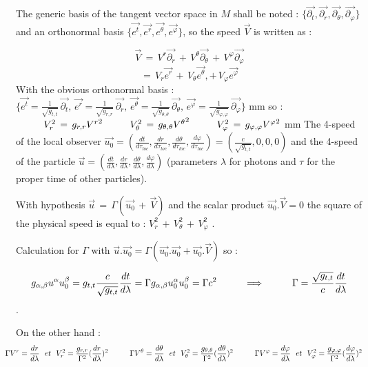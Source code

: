 \documentclass [12pt]{article}
\def\ph#1{\hskip #1}
\def\pv#1{\vskip #1}
\begin{document}
The generic basis of the tangent vector space in $M$ shall be noted :
 $\{\vec {\partial_t}, \vec {\partial_r}, \vec {\partial_\theta}, \vec {\partial_\varphi}  \}$ 
and an orthonormal basis $\{\vec {e^t},\vec {e^r}, \vec {e^\theta}, \vec {e^\varphi} \}$, so the speed $\vec {V}$ is written as    :

 $$\vec {V}\,=\,V^r \vec {\partial_r} \,+\,V^\theta \vec {\partial_\theta}\,+\,V^\varphi \vec {\partial_\varphi}$$
 $$=\,V_r \vec {e^r}\,+\,V_\theta \vec {e^\theta} ,+\,V_\varphi \vec {e^\varphi} $$
With the obvious orthonormal basis : $\{\vec {e^t}=\frac{1}{\sqrt{  g_{t,t} }}\,\vec {\partial_t},\,\vec {e^r}=
\frac{1}{\sqrt{  g_{r,r} }}\,\vec {\partial_r},\,\vec {e^\theta}=
\frac{1}{\sqrt{  g_{\theta,\theta} }}\,\vec {\partial_\theta},\,\vec {e^\varphi}=\frac{1}{\sqrt{  g_{\varphi,\varphi} }}\,\vec {\partial_\varphi} \} $
\pv 3mm
so : $\ph 10mm V_r^2\,=\,g_{r,r}{V^r}^2 \ph 10mmV_\theta^2\,=\,g_{\theta,\theta}{V^\theta}^2 \ph10mm V_\varphi^2\,=\,g_{\varphi,\varphi}{V^\varphi}^2$
\pv 3mm
The 4-speed of the local observer $\vec{u_0}=(\displaystyle\frac{dt}{d\tau_{loc}},\frac{dr}{d\tau_{loc}},\frac{d\theta}{d\tau_{loc}},\frac{d\varphi}{d\tau_{loc}})
=(\frac{c}{\sqrt{  g_{t,t} }},0,0,0)  $ and  the 4-speed of the particle $\vec{u}=(\displaystyle\frac{dt}{d\lambda},\frac{dr}{d\lambda},
\frac{d\theta}{d\lambda},\frac{d\varphi}{d\lambda})$ (parameters $\lambda$ for photons and $\tau$ for the proper time of other particles).

With hypothesis $ \vec u\,=\,\Gamma(\vec {u_0}\,+\,\vec {V})$ and the scalar product $\vec {u_0} . \vec {V} = 0$ 
 the square of the physical speed is equal to : $V_r^2\,+\,V_\theta^2\,+\,V_\varphi^2$ .

Calculation for $\Gamma$ with $\vec u.\vec {u_0}=\Gamma(\vec {u_0}.\vec {u_0}+\vec {u_0}.\vec {V})$ so : 

$$g_{\alpha,\beta}u^\alpha u_0^\beta= g_{t,t}\displaystyle\frac{c}{\sqrt{  g_{t,t} }}\frac{dt}{d\lambda}   = \Gamma g_{\alpha,\beta}u_0^\alpha u_0^\beta=\Gamma c^2
\ph 10mm\Longrightarrow \ph 10mm \Gamma= \frac{\sqrt{  g_{t,t} }}{c}\frac{dt}{d\lambda}        $$.

On the other hand : 
 $$\ph -5mm \Gamma V^r=\displaystyle \frac{dr}{d\lambda}\ \ et\ \  V_r^2=\frac{  g_{r,r}  }{\Gamma^2}({\frac{dr}{d\lambda}})^2 
\ph 10mm \Gamma V^\theta=\displaystyle \frac{d\theta}{d\lambda}\ \ et\ \ V_\theta^2=\frac{  g_{\theta,\theta}   }{\Gamma^2}({\frac{d\theta}{d\lambda}})^2
 \ph 10mm \Gamma V^\varphi=\displaystyle \frac{d\varphi}{d\lambda}\ \ et\ \ V_\varphi^2=\frac{  g_{\varphi,\varphi}   }{\Gamma^2}({\frac{d\varphi}{d\lambda}})^2$$
\end{document}

